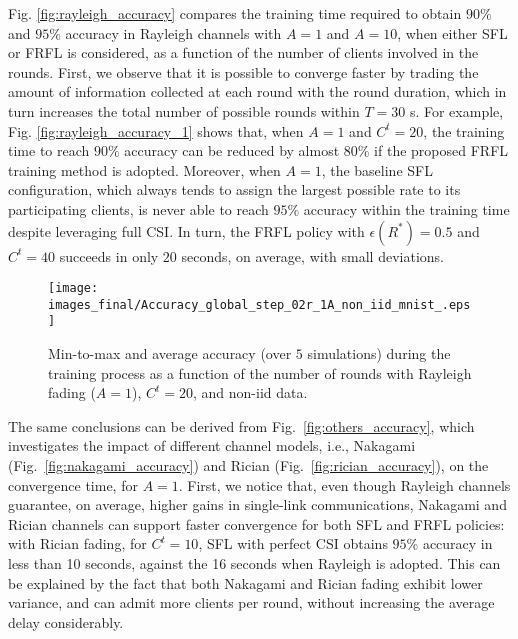 \documentclass[10pt, conference, letterpaper]{IEEEtran}
\begin{document}
	
	Fig. \ref{fig:rayleigh_accuracy} compares the training time required to obtain $90\%$ and $95\%$ accuracy in Rayleigh channels with $A=1$ and $A=10$, when either SFL or FRFL is considered, as a function of the number of clients involved in the rounds. 
	First, we observe that it is possible to converge faster by trading the amount of information collected at each round with the round duration, which in turn increases the total number of possible rounds within $T=30$ s.  
	For example, Fig. \ref{fig:rayleigh_accuracy_1} shows that, when $A=1$ and $C^t=20$, the training time to reach $90\%$ accuracy can be reduced by almost $80\%$ if the proposed FRFL training method is adopted. Moreover, when $A=1$, the baseline SFL configuration, which always tends to assign the largest possible rate to its participating clients, is never able to reach $95\%$ accuracy within the training time despite leveraging full CSI. In turn, the FRFL policy with $\epsilon(R^*) = 0.5$ and $C^t=40$ succeeds in only $20$ seconds, on average, with small deviations. 
	\begin{figure}[t!]
		\setlength{\belowcaptionskip}{-0.33cm}
		\centering
		\texttt{[image: images\_final/Accuracy\_global\_step\_02r\_1A\_non\_iid\_mnist\_.eps]}
		\caption{Min-to-max and average accuracy (over $5$ simulations) during the training process as a function of the number of rounds with Rayleigh fading ($A=1$), $C^t=20$, and non-\gls{iid} data. }
		\label{fig:number_of_rounds}
	\end{figure}
	The same conclusions can be derived from Fig.~\ref{fig:others_accuracy}, which investigates the impact of different channel models, i.e., Nakagami (Fig.~\ref{fig:nakagami_accuracy}) and Rician (Fig.~\ref{fig:rician_accuracy}), on the convergence time, for $A=1$. 
	First, we notice that, even though Rayleigh channels guarantee, on average, higher gains in single-link communications, Nakagami and Rician channels can support faster convergence for both SFL and FRFL policies: with Rician fading, for $C^t=10$, SFL with perfect CSI obtains $95\%$ accuracy in less than 10 seconds, against the 16 seconds when Rayleigh is adopted. This can be explained by the fact that both Nakagami and Rician fading exhibit lower variance, and can admit more clients per round, without increasing the average delay considerably.
\end{document}
